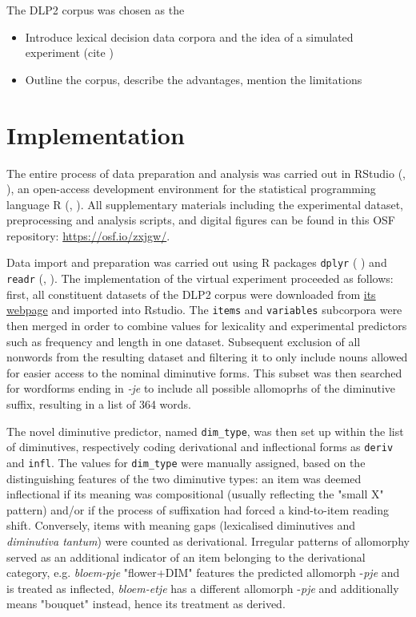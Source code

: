 The DLP2 corpus was chosen as the 

\begin{itemize}
\item Introduce lexical decision data corpora and the idea of a simulated experiment (cite \cite{Brysbaert+etal+2016})
\item Outline the corpus, describe the advantages, mention the limitations \par

\end{itemize}
\section{Implementation}
The entire process of data preparation and analysis was carried out in RStudio (\citeauthor{RStudio}, \citeyear{RStudio}), an open-access development environment for the statistical programming language R (\citeauthor{rlang}, \citeyear{rlang}). All supplementary materials including the experimental dataset, preprocessing and analysis scripts, and digital figures can be found in this OSF repository: \url{https://osf.io/zxjgw/}. 

Data import and preparation was carried out using R packages \texttt{dplyr} (\citeauthor{dplyr+2022} \citeyear{dplyr+2022}) and \texttt{readr} (\citeauthor{readr+2022}, \citeyear{readr+2022}). The implementation of the virtual experiment proceeded as follows: first, all constituent datasets of the DLP2 corpus were downloaded from \href{http://crr.ugent.be/archives/1796}{its webpage} and imported into Rstudio. The \texttt{items} and \texttt{variables} subcorpora were then merged in order to combine values for lexicality and experimental predictors such as frequency and length in one dataset. Subsequent exclusion of all nonwords from the resulting dataset and filtering it to only include nouns allowed for easier access to the nominal diminutive forms. This subset was then searched for wordforms ending in \textit{-je} to include all possible allomoprhs of the diminutive suffix, resulting in a list of 364 words.

The novel diminutive predictor, named \texttt{dim\_type}, was then set up within the list of diminutives, respectively coding derivational and inflectional forms as \texttt{deriv} and \texttt{infl}. The values for \texttt{dim\_type} were manually assigned, based on the  distinguishing features of the two diminutive types: an item was deemed inflectional if its meaning was compositional (usually reflecting the "small X" pattern) and/or if the process of suffixation had forced a kind-to-item reading shift. Conversely, items with meaning gaps (lexicalised diminutives and \textit{diminutiva tantum}) were counted as derivational. Irregular patterns of allomorphy served as an additional indicator of an item belonging to the derivational category, e.g. \textit{bloem-pje} "flower+DIM" features the predicted allomorph -\textit{pje} and is treated as inflected, \textit{bloem-etje} has a different allomorph -\textit{pje} and additionally means "bouquet" instead, hence its treatment as derived. 

